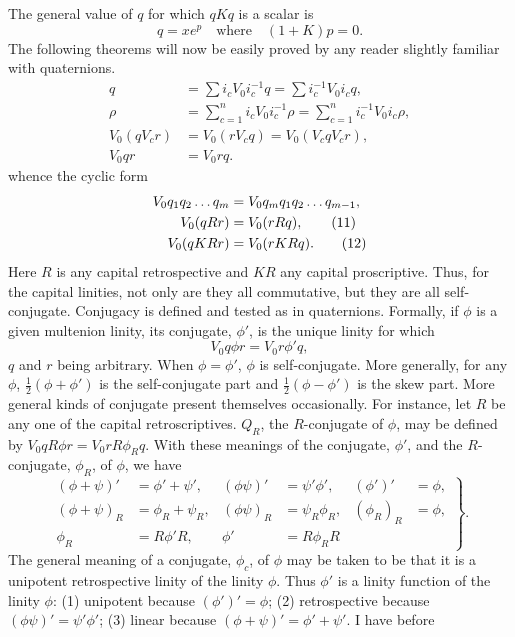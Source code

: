 \documentclass[11pt]{article}
\begin{document}
\indent The general value of $q$ for which $qKq$ is a scalar is
\begin{equation}q=xe^p\quad\text{where}\quad(1+K)p=0.\tag{6}\end{equation}
The following theorems will now be easily proved by any reader slightly familiar with quaternions.
\begin{align}q&=\sum i_cV_0i_c^{-1}q=\sum i_c^{-1}V_0i_cq,\tag{7}\\ \rho&=\sum_{c=1}^ni_cV_0i_c^{-1}\rho=\sum_{c=1}^ni_c^{-1}V_0i_c\rho,\tag{8}\\V_0(qV_cr)&=V_0(rV_cq)=V_0(V_cqV_cr),\tag{9}\\V_0qr&=V_0rq.\tag{10}\end{align}
whence the cyclic form
\begin{align}V_0q_1q_2\ldots q_m&=V_0q_mq_1q_2\ldots q_{m-1},\notag\\V_0(qRr)&=V_0(rRq),\tag{11}\\V_0(qKRr)&=V_0(rKRq).\tag{12}\end{align}
Here $R$ is any capital retrospective and $KR$ any capital proscriptive. Thus, for the capital linities, not only are they all commutative, but they are all self-conjugate. Conjugacy is defined and tested as in quaternions. Formally, if $\phi$ is a given multenion linity, its conjugate, $\phi'$, is the unique linity for which
\begin{equation}V_0q\phi r=V_0r\phi' q,\tag{13}\end{equation}
$q$ and $r$ being arbitrary. When $\phi=\phi'$, $\phi$ is self-conjugate. More generally, for any $\phi$, $\tfrac12(\phi+\phi')$ is the self-conjugate part and $\tfrac12(\phi-\phi')$ is the skew part. More general kinds of conjugate present themselves occasionally. For instance, let $R$ be any one of the capital retroscriptives. $Q_R$, the $R$-conjugate of $\phi$, may be defined by $V_0qR\phi r=V_0rR\phi_Rq$. With these meanings of the conjugate, $\phi'$, and the $R$-conjugate, $\phi_R$, of $\phi$, we have
\begin{equation}\left.\begin{aligned}(\phi+\psi)'&=\phi'+\psi',&(\phi\psi)'&=\psi'\phi',&(\phi')'&=\phi,\\(\phi+\psi)_R&=\phi_R+\psi_R,&(\phi\psi)_R&=\psi_R\phi_R,&(\phi_R)_R&=\phi,\\\phi_R&=R\phi'R,&\phi'&=R\phi_RR\end{aligned}\right\}.\tag{14}\end{equation}
The general meaning of a conjugate, $\phi_c$, of $\phi$ may be taken to be that it is a unipotent retrospective linity of the linity $\phi$. Thus $\phi'$ is a linity function of the linity $\phi$: (1) unipotent because $(\phi')'=\phi$; (2) retrospective because $(\phi\psi)'=\psi'\phi'$; (3) linear because $(\phi+\psi)'=\phi'+\psi'$. I have before
\end{document}
